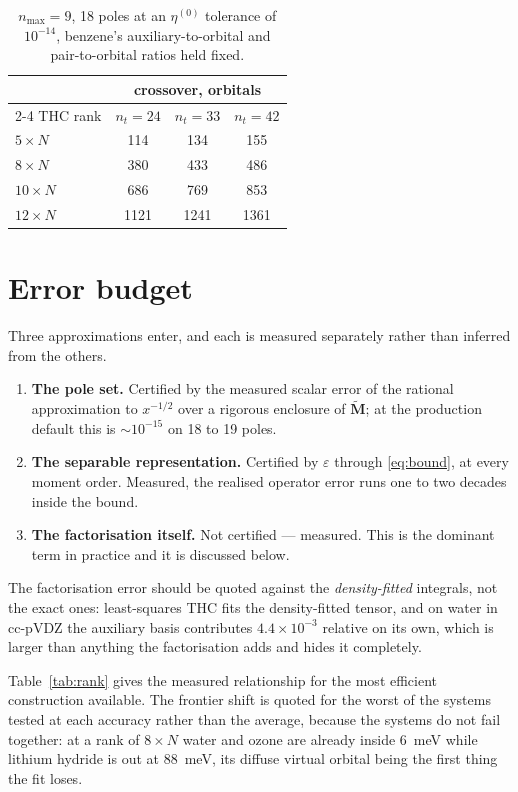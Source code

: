 \documentclass[11pt]{article}
\newcommand{\mat}[1]{{\mathbf{#1}}}
\begin{document}
\begin{table}[h]
\centering
\begin{tabular}{lccc}
\toprule
& \multicolumn{3}{c}{crossover, orbitals} \\
\cmidrule(l){2-4}
THC rank & $n_t = 24$ & $n_t = 33$ & $n_t = 42$ \\
\midrule
$5 \times N$  & 114 & 134 & 155 \\
$8 \times N$  & 380 & 433 & 486 \\
$10 \times N$ & 686 & 769 & 853 \\
$12 \times N$ & 1121 & 1241 & 1361 \\
\bottomrule
\end{tabular}
\caption{$n_{\max} = 9$, 18 poles at an $\eta^{(0)}$ tolerance of $10^{-14}$, benzene's
auxiliary-to-orbital and pair-to-orbital ratios held fixed.}
\label{tab:crossover}
\end{table}

\section{Error budget}

Three approximations enter, and each is measured separately rather than inferred from the
others.

\begin{enumerate}
\item \textbf{The pole set.} Certified by the measured scalar error of the rational
approximation to $x^{-1/2}$ over a rigorous enclosure of $\tilde{\mat{M}}$; at the
production default this is $\sim\!10^{-15}$ on 18 to 19 poles.
\item \textbf{The separable representation.} Certified by $\varepsilon$ through
\eqref{eq:bound}, at every moment order. Measured, the realised operator error runs one to
two decades inside the bound.
\item \textbf{The factorisation itself.} Not certified --- measured. This is the dominant
term in practice and it is discussed below.
\end{enumerate}

The factorisation error should be quoted against the \emph{density-fitted} integrals, not
the exact ones: least-squares THC fits the density-fitted tensor, and on water in cc-pVDZ
the auxiliary basis contributes $4.4\times10^{-3}$ relative on its own, which is larger than
anything the factorisation adds and hides it completely.

Table~\ref{tab:rank} gives the measured relationship for the most efficient construction
available. The frontier shift is quoted for the worst of the systems tested at each accuracy
rather than the average, because the systems do not fail together: at a rank of
$8 \times N$ water and ozone are already inside 6~meV while lithium hydride is out at
88~meV, its diffuse virtual orbital being the first thing the fit loses.
\end{document}
